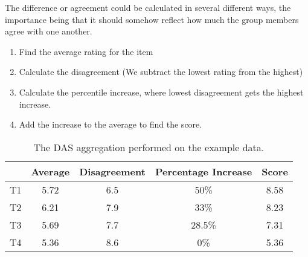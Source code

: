 The difference or agreement could be calculated in several different ways, the importance being that it should somehow reflect how much the group members agree with one another.

\begin{enumerate}
	\item Find the average rating for the item
	\item Calculate the disagreement (We subtract the lowest rating from the highest)
	\item Calculate the percentile increase, where lowest disagreement gets the highest increase.
	\item Add the increase to the average to find the score.
\end{enumerate}

\begin{table}[H]
	\centering
	\begin{tabular}{|l|c|c|c|c|}
		\hline
		& \multicolumn{1}{l|}{Average} & \multicolumn{1}{l|}{Disagreement} & \multicolumn{1}{l|}{Percentage Increase} & \multicolumn{1}{l|}{Score} \\ \hline
		T1 & 5.72                         & 6.5                               & 50\%                                     & 8.58                       \\ \hline
		T2 & 6.21                         & 7.9                               & 33\%                                     & 8.23                       \\ \hline
		T3 & 5.69                         & 7.7                               & 28.5\%                                   & 7.31                       \\ \hline
		T4 & 5.36                         & 8.6                               & 0\%                                      & 5.36                       \\ \hline
	\end{tabular}
	\caption{The DAS aggregation performed on the example data.}
	\label{tbl:DASexample}
\end{table}